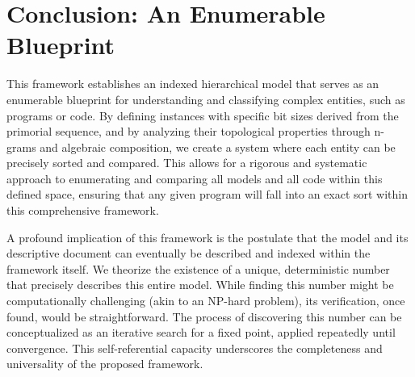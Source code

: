 \documentclass{article}
\begin{document}
\section{Conclusion: An Enumerable Blueprint}
This framework establishes an indexed hierarchical model that serves as an enumerable blueprint for understanding and classifying complex entities, such as programs or code. By defining instances with specific bit sizes derived from the primorial sequence, and by analyzing their topological properties through n-grams and algebraic composition, we create a system where each entity can be precisely sorted and compared. This allows for a rigorous and systematic approach to enumerating and comparing all models and all code within this defined space, ensuring that any given program will fall into an exact sort within this comprehensive framework.

A profound implication of this framework is the postulate that the model and its descriptive document can eventually be described and indexed within the framework itself. We theorize the existence of a unique, deterministic number that precisely describes this entire model. While finding this number might be computationally challenging (akin to an NP-hard problem), its verification, once found, would be straightforward. The process of discovering this number can be conceptualized as an iterative search for a fixed point, applied repeatedly until convergence. This self-referential capacity underscores the completeness and universality of the proposed framework.
\end{document}
